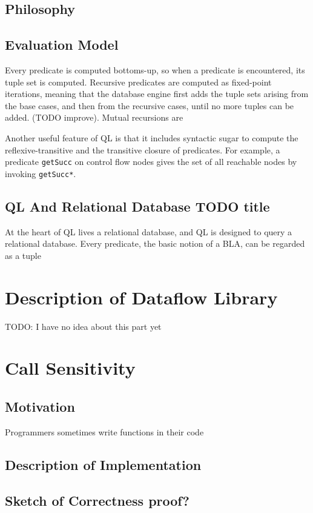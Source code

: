 \subsection{Philosophy}


\cite{qlpaper}
\subsection{Evaluation Model}
Every predicate is computed bottoms-up, so when a predicate is encountered, its
tuple set is computed.
Recursive predicates are computed as fixed-point iterations, meaning that the database engine 
first adds the tuple sets arising from the base cases, and then from the recursive cases, until
no more tuples can be added. (TODO improve).
Mutual recursions are 

Another useful feature of QL is that it includes syntactic sugar to compute the reflexive-transitive
and the transitive closure of predicates.
For example, a predicate \texttt{getSucc} on control flow nodes gives the set of all reachable
nodes by invoking \texttt{getSucc*}.

\subsection{QL And Relational Database TODO title}
At the heart of QL lives a relational database, and QL is designed to query a relational database.
Every predicate, the basic notion of a BLA, can be regarded as a tuple




\newpage
\section{Description of Dataflow Library}
TODO: I have no idea about this part yet

\newpage
\section{Call Sensitivity}
\subsection{Motivation}
Programmers sometimes write functions in their code 


\subsection{Description of Implementation}
\subsection{Sketch of Correctness proof?}

